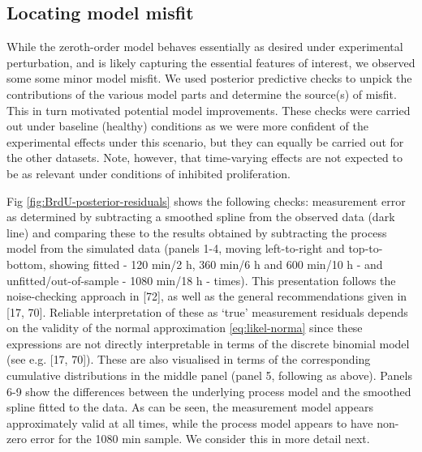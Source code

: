 \documentclass[10pt,letterpaper]{article}
\begin{document}
\subsection{Locating model misfit}\label{locating-model-misfit}

While the zeroth-order model behaves essentially as desired under
experimental perturbation, and is likely capturing the essential
features of interest, we observed some some minor model misfit. We used
posterior predictive checks to unpick the contributions of the various
model parts and determine the source(s) of misfit. This in turn
motivated potential model improvements. These checks were carried out
under baseline (healthy) conditions as we were more confident of the
experimental effects under this scenario, but they can equally be
carried out for the other datasets. Note, however, that time-varying
effects are not expected to be as relevant under conditions of inhibited
proliferation.

Fig \ref{fig:BrdU-posterior-residuals} shows the following checks:
measurement error as determined by subtracting a smoothed spline from
the observed data (dark line) and comparing these to the results
obtained by subtracting the process model from the simulated data
(panels 1-4, moving left-to-right and top-to-bottom, showing fitted -
120 min/2 h, 360 min/6 h and 600 min/10 h - and unfitted/out-of-sample -
1080 min/18 h - times). This presentation follows the noise-checking
approach in {[}72{]}, as well as the general recommendations given in
{[}17, 70{]}. Reliable interpretation of these as `true' measurement
residuals depends on the validity of the normal approximation
\ref{eq:likel-norma} since these expressions are not directly
interpretable in terms of the discrete binomial model (see e.g. {[}17,
70{]}). These are also visualised in terms of the corresponding
cumulative distributions in the middle panel (panel 5, following as
above). Panels 6-9 show the differences between the underlying process
model and the smoothed spline fitted to the data. As can be seen, the
measurement model appears approximately valid at all times, while the
process model appears to have non-zero error for the 1080 min sample. We
consider this in more detail next.
\end{document}
